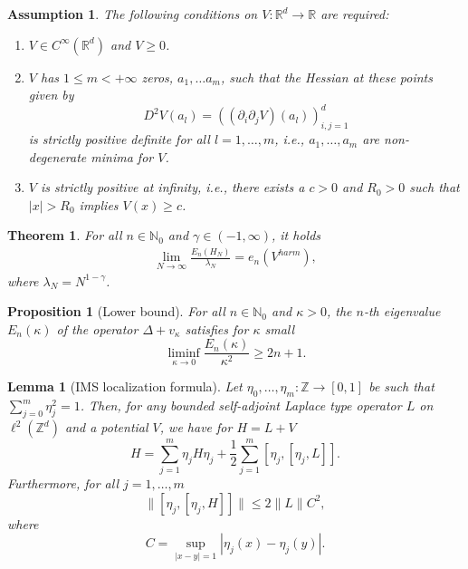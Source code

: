 \documentclass[10pt,a4paper]{amsart}
\newtheorem{assumption}{Assumption}
\newtheorem{theorem}{Theorem}
\newtheorem{proposition}{Proposition}
\newtheorem{lemma}{Lemma}
\newcommand{\R}{{\mathbb R}}
\newcommand{\Z}{{\mathbb Z}}
\begin{document}
\begin{assumption}\label{assumption}
The following conditions on $V:\R^d\to \R$ are required:
    \begin{enumerate}
	\item[(V1)] $V\in C^{\infty}(\mathbb{R}^d)$ and $V\geq 0$.
	\item[(V2)] $V$ has $1\leq m <+\infty$ zeros, $a_1,\dots a_m$, such that the Hessian at these points  given by    
    \begin{equation*}%
	   D^2V(a_l) = ((\partial_{i}\partial_{j}V)(a_l))_{i,j=1}^d
	\end{equation*}
    is strictly positive definite for all $l=1,\ldots,m$, i.e., $a_1,\ldots, a_m$ are non-degenerate minima for $V$.
	\item[(V3)] $V$ is strictly positive at infinity, i.e., there exists a $c >0 $ and $R_{0}>0$ such that $|x|> R_{0}$ implies $V(x)\geq c$.
    \end{enumerate}
\end{assumption}

\begin{theorem}\label{thm:eigenvalue_asymptotics_harmonic_oscillator_main}
    For all $n\in \mathbb{N}_0$ and $\gamma\in (-1,\infty)$, it holds
    \begin{align*}
        \lim_{N\to \infty} \frac{E_n(H_N)}{\lambda_N} = e_n(V^{harm}),
    \end{align*}
    where $\lambda_N=N^{1-\gamma}$.
\end{theorem}

\begin{proposition}[Lower bound]\label{thm:lowerbound}
    For all $n\in \mathbb{N}_0$ and $\kappa>0$, the $n$-th eigenvalue $E_n(\kappa)$ of the operator $\Delta + v_\kappa$ satisfies for  $\kappa$ small 
    $$\liminf_{\kappa\to 0} \frac{E_n(\kappa)}{\kappa^2} \geq   2n+1 .$$
\end{proposition}

\begin{lemma}[IMS localization formula]\label{lem:IMS}
Let $\eta_0,\ldots,\eta_m:\Z\to [0,1]$ be such that $\sum_{j=0}^m\eta_j^2=1$. Then, for any bounded self-adjoint Laplace type operator $L$ on $\ell^2(\Z^d)$ and a potential $V$, we have for $H=L+V$
\[H= \sum_{j=1}^m \eta_j H \eta_j +\frac12\sum_{j=1}^m [\eta_j,[\eta_j,L]].\]
Furthermore, for all $j=1,\ldots,m$
\[\| [\eta_j,[  \eta_j,H]]\|\leq 2\|L\| C^2,\]
where
\[C=\sup_{|x-y|=1} |\eta_j(x)-\eta_j(y)|.\]
\end{lemma}
\end{document}
